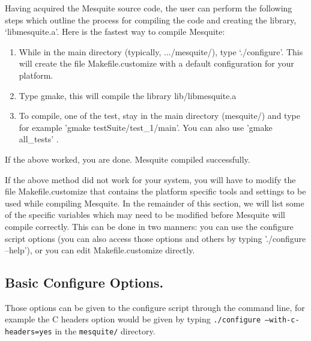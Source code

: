 \documentclass[letter]{report}
\begin{document}
Having acquired the Mesquite source code, the user can perform the
following steps which outline the process for compiling the code and
creating the library, `libmesquite.a'. Here is the fastest way to compile Mesquite:
\begin{enumerate}
\item While in the main directory (typically, .../mesquite/), type
`./configure'.  This will create the file Makefile.customize with a default configuration
for your platform.
\item Type gmake, this will compile the library lib/libmesquite.a
\item To compile, one of the test, stay in the main directory (mesquite/) and type 
for example 'gmake testSuite/test\_1/main'. You can also use 'gmake all\_tests' .
\end{enumerate}
If the above worked, you are done. Mesquite compiled successfully. 

If the above method did not work for your system, you will have to modify the file
Makefile.customize that contains the platform specific tools and settings to be used 
while compiling Mesquite. In the remainder of this section, we
will  list some of the specific variables which
may need to be modified before Mesquite will compile correctly.
This can be done in two manners: you can use the configure
script options (you can also access those options and
others by typing './configure --help'), or you can edit
Makefile.customize directly.

\subsection{Basic Configure Options.}  \label{config_options}

Those options can be given to the configure script through the command line, for example the C headers
option would be given by typing \texttt{./configure --with-c-headers=yes} in the \texttt{mesquite/} directory.
\end{document}
